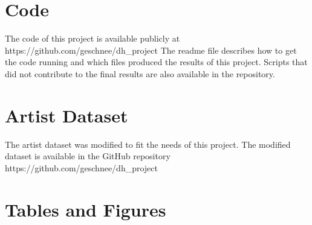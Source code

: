 \label{sec:Appendix}

\section{Code}

The code of this project is available publicly at https://github.com/geschnee/dh\_project
The readme file describes how to get the code running and which files produced the results of this project.
Scripts that did not contribute to the final results are also available in the repository.

\section{Artist Dataset}
\label{modified_artist_dataset}

The artist dataset \autocite{thelist} was modified to fit the needs of this project. The modified dataset is available in the GitHub repository https://github.com/geschnee/dh\_project

\section{Tables and Figures}


